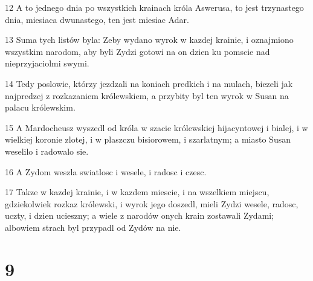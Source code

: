 \par 12 A to jednego dnia po wszystkich krainach króla Aswerusa, to jest trzynastego dnia, miesiaca dwunastego, ten jest miesiac Adar.
\par 13 Suma tych listów byla: Zeby wydano wyrok w kazdej krainie, i oznajmiono wszystkim narodom, aby byli Zydzi gotowi na on dzien ku pomscie nad nieprzyjaciolmi swymi.
\par 14 Tedy poslowie, którzy jezdzali na koniach predkich i na mulach, biezeli jak najpredzej z rozkazaniem królewskiem, a przybity byl ten wyrok w Susan na palacu królewskim.
\par 15 A Mardocheusz wyszedl od króla w szacie królewskiej hijacyntowej i bialej, i w wielkiej koronie zlotej, i w plaszczu bisiorowem, i szarlatnym; a miasto Susan weselilo i radowalo sie.
\par 16 A Zydom weszla swiatlosc i wesele, i radosc i czesc.
\par 17 Takze w kazdej krainie, i w kazdem miescie, i na wszelkiem miejscu, gdziekolwiek rozkaz królewski, i wyrok jego doszedl, mieli Zydzi wesele, radosc, uczty, i dzien ucieszny; a wiele z narodów onych krain zostawali Zydami; albowiem strach byl przypadl od Zydów na nie.

\chapter{9}

